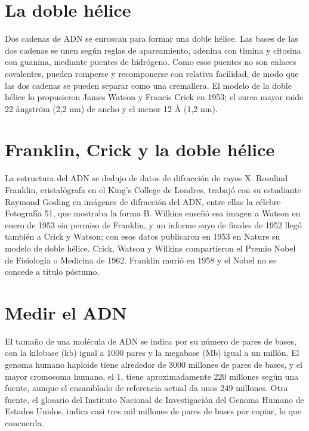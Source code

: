\documentclass{book}
\begin{document}
\section{La doble hélice}

Dos cadenas de ADN se enroscan para formar una doble hélice. Las bases de las dos cadenas se unen según reglas de apareamiento, adenina con timina y citosina con guanina, mediante puentes de hidrógeno. Como esos puentes no son enlaces covalentes, pueden romperse y recomponerse con relativa facilidad, de modo que las dos cadenas se pueden separar como una cremallera. El modelo de la doble hélice lo propusieron James Watson y Francis Crick en 1953; el surco mayor mide 22 ångström (2,2 nm) de ancho y el menor 12 Å (1,2 nm).


\section{Franklin, Crick y la doble hélice}

La estructura del ADN se dedujo de datos de difracción de rayos X. Rosalind Franklin, cristalógrafa en el King's College de Londres, trabajó con su estudiante Raymond Gosling en imágenes de difracción del ADN, entre ellas la célebre Fotografía 51, que mostraba la forma B. Wilkins enseñó esa imagen a Watson en enero de 1953 sin permiso de Franklin, y un informe suyo de finales de 1952 llegó también a Crick y Watson; con esos datos publicaron en 1953 en Nature su modelo de doble hélice. Crick, Watson y Wilkins compartieron el Premio Nobel de Fisiología o Medicina de 1962. Franklin murió en 1958 y el Nobel no se concede a título póstumo.


\section{Medir el ADN}

El tamaño de una molécula de ADN se indica por su número de pares de bases, con la kilobase (kb) igual a 1000 pares y la megabase (Mb) igual a un millón. El genoma humano haploide tiene alrededor de 3000 millones de pares de bases, y el mayor cromosoma humano, el 1, tiene aproximadamente 220 millones según una fuente, aunque el ensamblado de referencia actual da unos 249 millones. Otra fuente, el glosario del Instituto Nacional de Investigación del Genoma Humano de Estados Unidos, indica casi tres mil millones de pares de bases por copiar, lo que concuerda.
\end{document}
